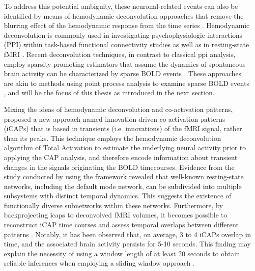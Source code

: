 To address this potential ambiguity, these neuronal-related events can also be
identified by means of hemodynamic deconvolution approaches that remove the
blurring effect of the hemodynamic response from the time series
\citep{Gaudes2013Paradigmfreemapping,Karahanoglu2013TotalactivationfMRI,Petridou2013PeriodsrestfMRI}.
Hemodynamic deconvolution is commonly used in investigating psychophysiologic
interactions (PPI) within task-based functional connectivity studies
\citep{Gerchen2014Analyzingtaskdependent,Gitelman2003Modelingregionalpsychophysiologic}
as well as in resting-state fMRI \citep{Di2015Characterizationsrestingstate}.
Recent deconvolution techniques, in contrast to classical \acrshort*{ppi}
analysis, employ sparsity-promoting estimators that assume the dynamics of
spontaneous brain activity can be characterized by sparse BOLD events
\citep{Gaudes2013Paradigmfreemapping,Karahanoglu2013TotalactivationfMRI,Petridou2013PeriodsrestfMRI,Urunuela2023HemodynamicDeconvolutionDemystified}.
These approaches are akin to methods using point process analysis to examine
sparse BOLD events \citep{Tagliazucchi2012Criticalitylargescale}, and will be
the focus of this thesis as introduced in the next section.

Mixing the ideas of hemodynamic deconvolution and co-activation patterns,
\cite{Karahanoglu2015Transientbrainactivity} proposed a new approach named
innovation-driven co-activation patterns (iCAPs) that is based in transients
(i.e. innovations) of the fMRI signal, rather than its peaks. This technique
employs the hemodynamic deconvolution algorithm of Total Activation
\citep{Karahanoglu2013TotalactivationfMRI} to estimate the underlying neural
activity prior to applying the CAP analysis, and therefore encode information
about transient changes in the signals originating the BOLD timecourses.
Evidence from the study conducted by
\cite{Karahanoglu2015Transientbrainactivity} using the framework revealed that
well-known resting-state networks, including the default mode network, can be
subdivided into multiple subsystems with distinct temporal dynamics. This
suggests the existence of functionally diverse subnetworks within these
networks. Furthermore, by backprojecting \acrshort*{icaps} to deconvolved fMRI
volumes, it becomes possible to reconstruct iCAP time courses and assess
temporal overlaps between different patterns
\citep{Zoller2019RobustRecoveryTemporal}. Notably, it has been observed that, on
average, 3 to 4 iCAPs overlap in time, and the associated brain activity
persists for 5-10 seconds. This finding may explain the necessity of using a
window length of at least 20 seconds to obtain reliable inferences when
employing a sliding window approach
\citep{Karahanoglu2015Transientbrainactivity,Preti2017dynamicfunctionalconnectome}.

